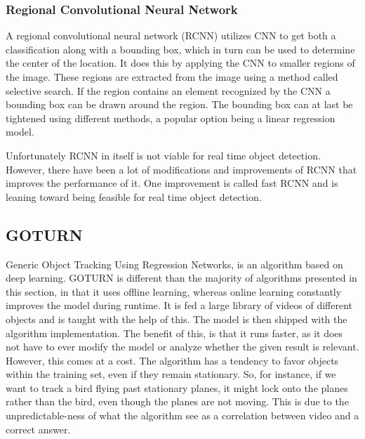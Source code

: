 \subsubsection{Regional Convolutional Neural Network}

A regional convolutional neural network (RCNN) utilizes CNN to get both a classification along with a bounding box, which in turn can be used to determine the center of the location.
It does this by applying the CNN to smaller regions of the image. 
These regions are extracted from the image using a method called selective search.
If the region contains an element recognized by the CNN a bounding box can be drawn around the region.
The bounding box can at last be tightened using different methods, a popular option being a linear regression model.\cite{CNNHistory}

Unfortunately RCNN in itself is not viable for real time object detection.
However, there have been a lot of modifications and improvements of RCNN that improves the performance of it.
One improvement is called fast RCNN and is leaning toward being feasible for real time object detection.





\subsection{GOTURN}
Generic Object Tracking Using Regression Networks, is an algorithm based on deep learning.\cite{goturn}
GOTURN is different than the majority of algorithms presented in this section, in that it uses offline learning, whereas online learning constantly improves the model during runtime.
It is fed a large library of videos of different objects and is taught with the help of this.
The model is then shipped with the algorithm implementation.
The benefit of this, is that it runs faster, as it does not have to ever modify the model or analyze whether the given result is relevant.
However, this comes at a cost. 
The algorithm has a tendency to favor objects within the training set, even if they remain stationary.
So, for instance, if we want to track a bird flying past stationary planes, it might lock onto the planes rather than the bird, even though the planes are not moving.
This is due to the unpredictable-ness of what the algorithm see as a correlation between video and a correct answer.


